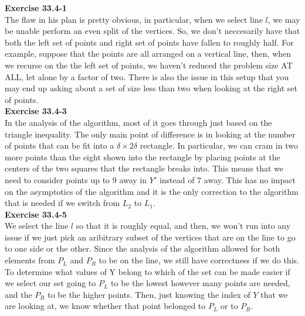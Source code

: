 \documentclass{article}
\begin{document}
\noindent\textbf{Exercise 33.4-1}\\

The flaw in his plan is pretty obvious, in particular, when we select line $l$, we may be unable perform an even split of the vertices. So, we don't neccesarily have that both the left set of points and right set of points have fallen to roughly half. For example, suppose that the points are all arranged on a vertical line, then, when we recurse on the the left set of points, we haven't reduced the problem size AT ALL, let alone by a factor of two. There is also the issue in this setup that you may end up asking about a set of size less than two when looking at the right set of points.\\



\noindent\textbf{Exercise 33.4-3}\\

In the analysis of the algorithm, most of it goes through just based on the triangle inequality. The only main point of difference is in looking at the number of points that can be fit into a $\delta \times 2\delta$ rectangle. In particular, we can cram in two more points than the eight shown into the rectangle by placing points at the centers of the two squares that the rectangle breaks into. This means that we need to consider points up to 9 away in $Y'$ instead of 7 away. This has no impact on the asymptotics of the algorithm and it is the only correction to the algorithm that is needed if we switch from $L_2$ to $L_1$.\\



\noindent\textbf{Exercise 33.4-5}\\

We select the line $l$ so that it is roughly equal, and then, we won't run into any issue if we just pick an aribitrary subset of the vertices that are on the line to go to one side or the other. Since the analysis of the algorithm allowed for both elements from $P_L$ and $P_R$ to be on the line, we still have correctness if we do this. To determine what values of Y belong to which of the set can be made easier if we select our set going to $P_L$ to be the lowest however many points are needed, and the $P_R$ to be the higher points. Then, just knowing the index of $Y$ that we are looking at, we know whether that point belonged to $P_L$ or to $P_R$.\\
\end{document}
